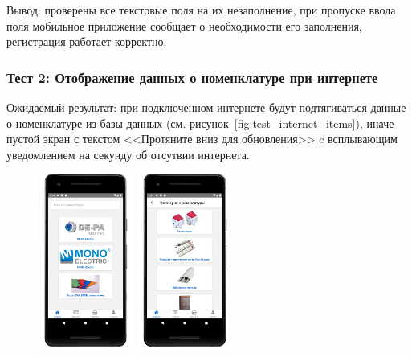 Вывод: проверены все текстовые поля на их незаполнение, при пропуске ввода поля мобильное приложение сообщает о необходимости его заполнения, регистрация работает корректно.


\subsubsection*{Тест 2: Отображение данных о номенклатуре при интернете}

Ожидаемый результат: при подключенном интернете будут подтягиваться данные о номенклатуре из базы данных (см. рисунок~\ref{fig:test_internet_items}),
иначе пустой экран с текстом <<Протяните вниз для обновления>>
c всплывающим уведомлением на секунду об отсутвии интернета.

\begin{figure}[!htb]\centering
    \begin{minipage}{0.16\textwidth}
        \centering

        \includegraphics[height=5.8cm]
        {images/mobile/items/item-brands.png}
    \end{minipage}
    \begin{minipage}{0.16\textwidth}
        \centering

        \includegraphics[height=5.8cm]
        {images/mobile/items/item-categories.png}
    \end{minipage}
    \begin{minipage}{0.16\textwidth}
        \centering


\end{minipage}
\end{figure}
